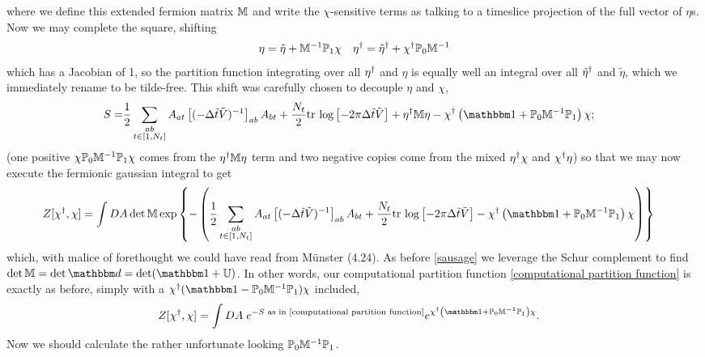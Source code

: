 where we define this extended fermion matrix $\mathbb{M}$ and write the $\chi$-sensitive terms as talking to a timeslice projection of the full vector of $\eta$s.
Now we may complete the square, shifting
\begin{align}
	\eta &= \tilde{\eta} + \mathbb{M}^{-1} \mathbb{P}_1 \chi
	&
	\eta{}^{\dagger} = \tilde{\eta}{}^{\dagger} + \chi{}^{\dagger} \mathbb{P}_0 \mathbb{M}^{-1}
\end{align}
which has a Jacobian of 1, so the partition function integrating over all $\eta{}^{\dagger}$ and $\eta$ is equally well an integral over all $\tilde{\eta}{}^{\dagger}$ and $\tilde{\eta}$, which we immediately rename to be tilde-free.
This shift was carefully chosen to decouple $\eta$ and $\chi$, 
\begin{align}
	S
	=&
	\frac{1}{2} \sum_{\substack{ab \\ t \in [1,N_t]}} A_{at} \left[(-\Delta\tilde{t} \tilde{V})\inverse\right]_{ab} A_{bt} + \frac{N_t}{2} \trlog{ -2\pi \Delta\tilde{t}\tilde{V} }
	+ \eta\adjoint \MM \eta
	- \chi\adjoint \left(\one + \PP_0 \MM\inverse \PP_1\right)\chi;
\end{align}
(one positive $\chi\mathbb{P}_0 \mathbb{M}^{-1} \mathbb{P}_1 \chi$ comes from the $\eta{}^{\dagger}\mathbb{M}\eta$ term and two negative copies come from the mixed $\eta{}^{\dagger}\chi$ and $\chi{}^{\dagger}\eta$)
so that we may now execute the fermionic gaussian integral to get
\begin{align}
	Z[\chi\adjoint, \chi]
	&=
	\int DA \det{\MM} \exp\left\{-\left(
		\frac{1}{2} \sum_{\substack{ab \\ t \in [1,N_t]}} A_{at} \left[(-\Delta\tilde{t} \tilde{V})\inverse\right]_{ab} A_{bt} + \frac{N_t}{2} \trlog{ -2\pi \Delta\tilde{t}\tilde{V} }
		- \chi\adjoint \left(\one + \PP_0 \MM\inverse \PP_1\right)\chi
	\right)\right\}
\end{align}
which, with malice of forethought we could have read from M\"{u}nster (4.24).
As before \eqref{sausage} we leverage the Schur complement to find $\det{\MM} = \det{\dd} = \det( \one + \UU )$.
In other words, our computational partition function \eqref{computational partition function} is exactly as before, simply with a $\chi\adjoint(\one - \PP_0 \MM\inverse \PP_1)\chi$ included,
\begin{align}
	Z[\chi\adjoint, \chi]
	&=
	\int DA\; e^{-S \text{ as in \eqref{computational partition function}}}
		e^{ \chi\adjoint \left(\one + \PP_0 \MM\inverse \PP_1\right)\chi }.
\end{align}
Now we should calculate the rather unfortunate looking $\mathbb{P}_0 \mathbb{M}^{-1} \mathbb{P}_1$.

